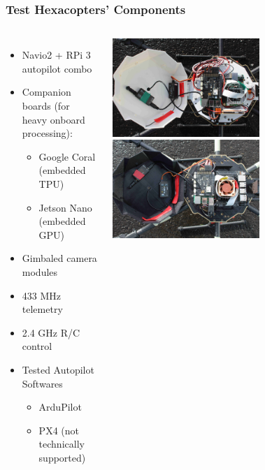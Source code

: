 \documentclass[aspectratio=169]{rubeamer}
\newif\ifpause
\newcommand{\mypause}{\ifpause \pause \fi}
\begin{document}
\begin{frame}
  \frametitle{Test Hexacopters' Components}
  \begin{columns}
    \begin{itemize}
      \mypause
      \item Navio2 + RPi 3 autopilot combo
      \mypause
      \item Companion boards (for heavy onboard processing):
      \begin{itemize}
        \mypause
        \item Google Coral (embedded TPU)
        \mypause
        \item Jetson Nano (embedded GPU)
      \end{itemize}
      \mypause
      \item Gimbaled camera modules
      \mypause
      \item 433 MHz telemetry
      \mypause
      \item 2.4 GHz R/C control
      \mypause
      \item Tested Autopilot Softwares
      \mypause
      \begin{itemize}
        \mypause
        \item ArduPilot
        \mypause
        \item PX4 (not technically supported)
      \end{itemize}
    \end{itemize}
    \centering
    \onslide
    \includegraphics[width=0.6\textwidth]{coral_electronics}\\
    \includegraphics[width=0.6\textwidth]{jetson_electronics}\\
  \end{columns}
\end{frame}
\end{document}
